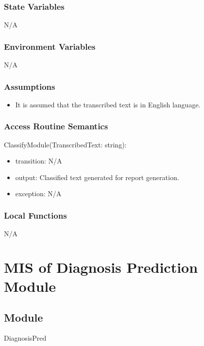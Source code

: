 \documentclass[12pt, titlepage]{article}
\begin{document}
\subsubsection{State Variables}

N/A

\subsubsection{Environment Variables}

N/A

\subsubsection{Assumptions}

\begin{itemize}
  \item It is assumed that the transcribed text is in English language.
\end{itemize}

\subsubsection{Access Routine Semantics}

\noindent ClassifyModule(TranscribedText: string):
\begin{itemize}
\item transition: N/A
\item output: Classified text generated for report generation. 
\item exception: N/A 
\end{itemize}

\subsubsection{Local Functions}

N/A

\newpage

\section{MIS of Diagnosis Prediction Module} \label{diag_pred_mod}

\subsection{Module}

DiagnosisPred
\end{document}
